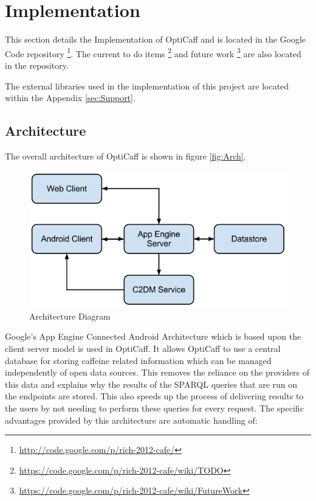 \section{Implementation}

This section details the Implementation of OptiCaff and is located in the Google Code repository \footnote{\url{http://code.google.com/p/rich-2012-cafe/}}. The current to do items \footnote{\url{https://code.google.com/p/rich-2012-cafe/wiki/TODO}} and future work \footnote{\url{https://code.google.com/p/rich-2012-cafe/wiki/FutureWork}} are also located in the repository.

The external libraries used in the implementation of this project are located within the Appendix \ref{sec:Support}.

\subsection{Architecture}

The overall architecture of OptiCaff is shown in figure \ref{fig:Arch}.

\begin{figure}[ht]
\begin{center}
\includegraphics[trim = 0mm 0mm 0mm 0mm, clip, scale=0.4]{images/Architecture.png}
\caption{Architecture Diagram \cite{AppEngine}} 
\end{center}
\end{figure}

Google’s App Engine Connected Android Architecture \cite{AppEngine} which is based upon the client server model is used in OptiCaff. It allows OptiCaff to use a central database for storing caffeine related information which can be managed independently of open data sources. This removes the reliance on the providers of this data and explains why the results of the SPARQL queries that are run on the endpoints are stored. This also speeds up the process of delivering results to the users by not needing to perform these queries for every request. The specific advantages provided by this architecture are automatic handling of:

